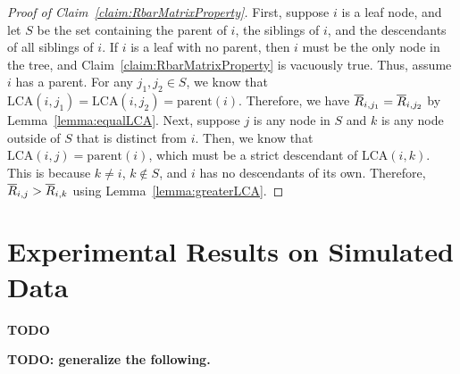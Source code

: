 \documentclass{article}
\theoremstyle{definition}
\begin{document}
\begin{proof}[Proof of Claim~\ref{claim:RbarMatrixProperty}]
First, suppose $i$ is a leaf node, and let $S$ be the set containing the parent of $i$, the siblings of $i$, and the descendants of all siblings of $i$.
If $i$ is a leaf with no parent, then $i$ must be the only node in the tree, and Claim~\ref{claim:RbarMatrixProperty} is vacuously true.
Thus, assume $i$ has a parent.
For any $j_1, j_2 \in S$, we know that $\text{LCA}(i, j_1) = \text{LCA}(i, j_2) = \text{parent}(i)$.
Therefore, we have $\overline{R}_{i,j_1} = \overline{R}_{i,j_2}$ by Lemma~\ref{lemma:equalLCA}.
Next, suppose $j$ is any node in $S$ and $k$ is any node outside of $S$ that is distinct from $i$.
Then, we know that $\text{LCA}(i,j) = \text{parent}(i)$, which must be a strict descendant of $\text{LCA}(i,k)$.
This is because $k \neq i$, $k \notin S$, and $i$ has no descendants of its own.
Therefore, $\overline{R}_{i,j} > \overline{R}_{i,k}$ using Lemma~\ref{lemma:greaterLCA}.
\end{proof}

\section{Experimental Results on Simulated Data}

{\bf TODO}


\clearpage
{\bf TODO: generalize the following.} \par



\end{document}
